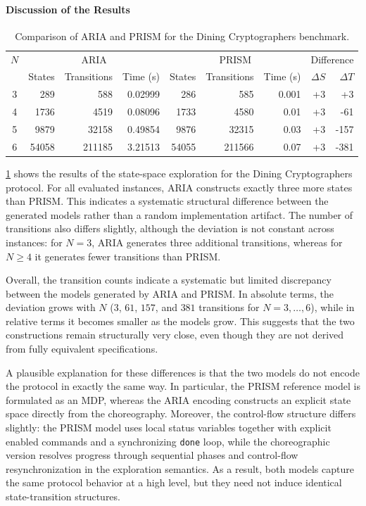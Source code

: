 \paragraph{Discussion of the Results}
\begin{table}[t]
	\centering
	\caption{Comparison of ARIA and PRISM for the Dining Cryptographers benchmark.}
	\label{tab:dining-comparison}
	\begin{tabularx}{\textwidth}{c|rrr|rrr|rr}
		\hline
		$N$ & \multicolumn{3}{c|}{ARIA} & \multicolumn{3}{c|}{PRISM} & \multicolumn{2}{c}{Difference} \\
		& States & Transitions & Time (s) & States & Transitions & Time (s) & $\Delta S$ & $\Delta T$ \\
		\hline
		3 & 289   & 588    & 0.02999 & 286   & 585    & 0.001 & +3 & +3 \\
		4 & 1736  & 4519   & 0.08096 & 1733  & 4580   & 0.01  & +3 & -61 \\
		5 & 9879  & 32158  & 0.49854 & 9876  & 32315  & 0.03  & +3 & -157 \\
		6 & 54058 & 211185 & 3.21513 & 54055 & 211566 & 0.07  & +3 & -381 \\
		\hline
	\end{tabularx}
\end{table}

\cref{tab:dining-comparison} shows the results of the state-space exploration for the Dining Cryptographers protocol. For all evaluated instances, \textsc{ARIA} constructs exactly three more states than PRISM. This indicates a systematic structural difference between the generated models rather than a random implementation artifact. The number of transitions also differs slightly, although the deviation is not constant across instances: for $N=3$, \textsc{ARIA} generates three additional transitions, whereas for $N \geq 4$ it generates fewer transitions than PRISM.

Overall, the transition counts indicate a systematic but limited discrepancy between the models generated by \textsc{ARIA} and PRISM. In absolute terms, the deviation grows with $N$ ($3$, $61$, $157$, and $381$ transitions for $N=3,\dots,6$), while in relative terms it becomes smaller as the models grow. This suggests that the two constructions remain structurally very close, even though they are not derived from fully equivalent specifications.

A plausible explanation for these differences is that the two models do not encode the protocol in exactly the same way. In particular, the PRISM reference model is formulated as an MDP, whereas the \textsc{ARIA} encoding constructs an explicit state space directly from the choreography. Moreover, the control-flow structure differs slightly: the PRISM model uses local status variables together with explicit enabled commands and a synchronizing \texttt{done} loop, while the choreographic version resolves progress through sequential phases and control-flow resynchronization in the exploration semantics. As a result, both models capture the same protocol behavior at a high level, but they need not induce identical state-transition structures. 

